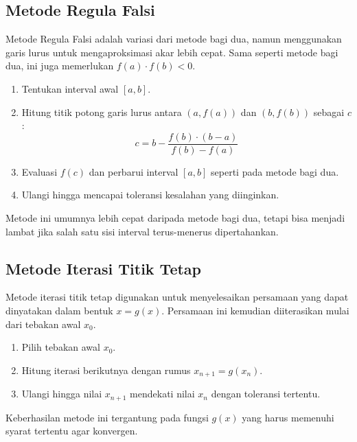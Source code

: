 \documentclass[a4paper,extrafontsizes, 9pt]{memoir}
\begin{document}
\begin{multicols}{3}
        \subsection{\small Metode Regula Falsi}
          Metode Regula Falsi adalah variasi dari metode bagi dua, namun menggunakan garis lurus untuk mengaproksimasi akar lebih cepat. Sama seperti metode bagi dua, ini juga memerlukan \(f(a) \cdot f(b) < 0\).
          \begin{enumerate}
              \item Tentukan interval awal \([a, b]\).
              \item Hitung titik potong garis lurus antara \((a, f(a))\) dan \((b, f(b))\) sebagai \(c\):
              \[
              c = b - \frac{f(b) \cdot (b - a)}{f(b) - f(a)}
              \]
              \item Evaluasi \(f(c)\) dan perbarui interval \([a, b]\) seperti pada metode bagi dua.
              \item Ulangi hingga mencapai toleransi kesalahan yang diinginkan.
          \end{enumerate}
          Metode ini umumnya lebih cepat daripada metode bagi dua, tetapi bisa menjadi lambat jika salah satu sisi interval terus-menerus dipertahankan.

        \subsection{\small Metode Iterasi Titik Tetap}
          Metode iterasi titik tetap digunakan untuk menyelesaikan persamaan yang dapat dinyatakan dalam bentuk \(x = g(x)\). Persamaan ini kemudian diiterasikan mulai dari tebakan awal \(x_0\).
          \begin{enumerate}
              \item Pilih tebakan awal \(x_0\).
              \item Hitung iterasi berikutnya dengan rumus \(x_{n+1} = g(x_n)\).
              \item Ulangi hingga nilai \(x_{n+1}\) mendekati nilai \(x_n\) dengan toleransi tertentu.
          \end{enumerate}
          Keberhasilan metode ini tergantung pada fungsi \(g(x)\) yang harus memenuhi syarat tertentu agar konvergen.


\end{multicols}
\end{document}
